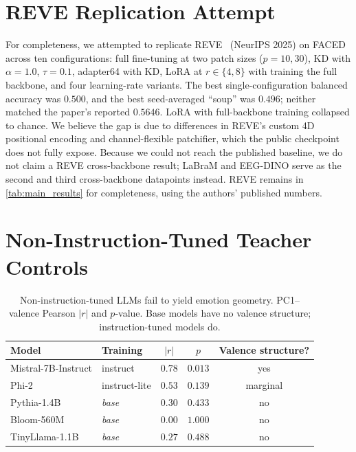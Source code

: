 \section{REVE Replication Attempt}
\label{sec:supp_reve}

For completeness, we attempted to replicate REVE~\cite{elouahidi2025reve} (NeurIPS 2025) on FACED across ten configurations: full fine-tuning at two patch sizes ($p = 10, 30$), KD with $\alpha = 1.0$, $\tau = 0.1$, adapter64 with KD, LoRA at $r \in \{4, 8\}$ with training the full backbone, and four learning-rate variants. The best single-configuration balanced accuracy was $0.500$, and the best seed-averaged ``soup'' was $0.496$; neither matched the paper's reported $0.5646$. LoRA with full-backbone training collapsed to chance. We believe the gap is due to differences in REVE's custom 4D positional encoding and channel-flexible patchifier, which the public checkpoint does not fully expose. Because we could not reach the published baseline, we do not claim a REVE cross-backbone result; LaBraM and EEG-DINO serve as the second and third cross-backbone datapoints instead. REVE remains in \cref{tab:main_results} for completeness, using the authors' published numbers.

\section{Non-Instruction-Tuned Teacher Controls}
\label{sec:supp_baseteachers}

\begin{table}[!h]
\caption{Non-instruction-tuned LLMs fail to yield emotion geometry. PC1--valence Pearson $|r|$ and $p$-value. Base models have no valence structure; instruction-tuned models do.}
\small
\centering
\begin{tabular}{llccc}
\toprule
Model & Training & $|r|$ & $p$ & Valence structure? \\
\midrule
Mistral-7B-Instruct & instruct & $0.78$ & $0.013$ & yes \\
Phi-2 & instruct-lite & $0.53$ & $0.139$ & marginal \\
\midrule
Pythia-1.4B & \emph{base} & $0.30$ & $0.433$ & no \\
Bloom-560M & \emph{base} & $0.00$ & $1.000$ & no \\
TinyLlama-1.1B & \emph{base} & $0.27$ & $0.488$ & no \\
\bottomrule
\end{tabular}
\label{tab:supp_baseteachers}
\end{table}

